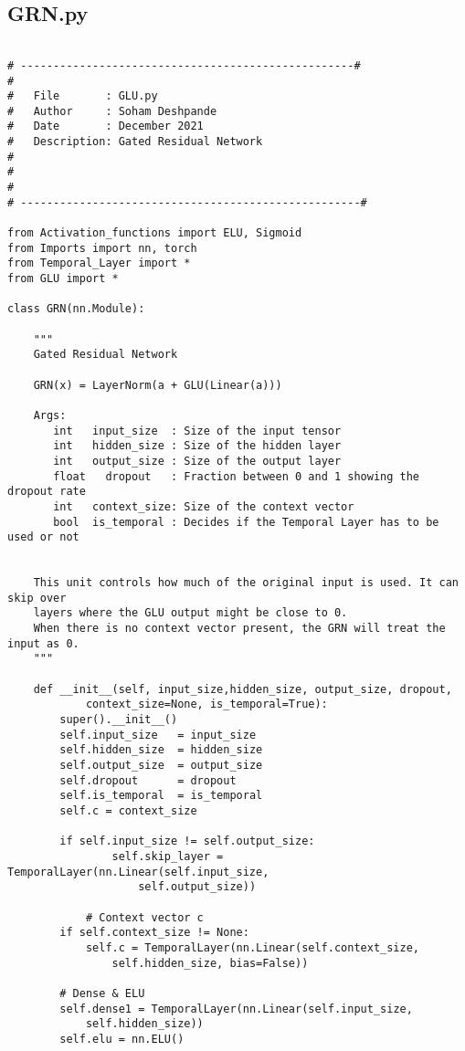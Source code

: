 \documentclass{article}
\begin{document}
\subsection{GRN.py}
\begin{lstlisting}

# ---------------------------------------------------#
#
#   File       : GLU.py
#   Author     : Soham Deshpande
#   Date       : December 2021
#   Description: Gated Residual Network
#
#
#
# ----------------------------------------------------#

from Activation_functions import ELU, Sigmoid
from Imports import nn, torch
from Temporal_Layer import *
from GLU import *

class GRN(nn.Module):

    """
    Gated Residual Network

    GRN(x) = LayerNorm(a + GLU(Linear(a)))

    Args:
       int   input_size  : Size of the input tensor
       int   hidden_size : Size of the hidden layer
       int   output_size : Size of the output layer
       float   dropout   : Fraction between 0 and 1 showing the dropout rate
       int   context_size: Size of the context vector
       bool  is_temporal : Decides if the Temporal Layer has to be used or not


    This unit controls how much of the original input is used. It can skip over
    layers where the GLU output might be close to 0.
    When there is no context vector present, the GRN will treat the input as 0.
    """

    def __init__(self, input_size,hidden_size, output_size, dropout,
            context_size=None, is_temporal=True):
        super().__init__()
        self.input_size   = input_size
        self.hidden_size  = hidden_size
        self.output_size  = output_size
        self.dropout      = dropout
        self.is_temporal  = is_temporal
        self.c = context_size

        if self.input_size != self.output_size:
                self.skip_layer = TemporalLayer(nn.Linear(self.input_size,
                    self.output_size))

            # Context vector c
        if self.context_size != None:
            self.c = TemporalLayer(nn.Linear(self.context_size,
                self.hidden_size, bias=False))

        # Dense & ELU
        self.dense1 = TemporalLayer(nn.Linear(self.input_size,
            self.hidden_size))
        self.elu = nn.ELU()


\end{lstlisting}
\end{document}
